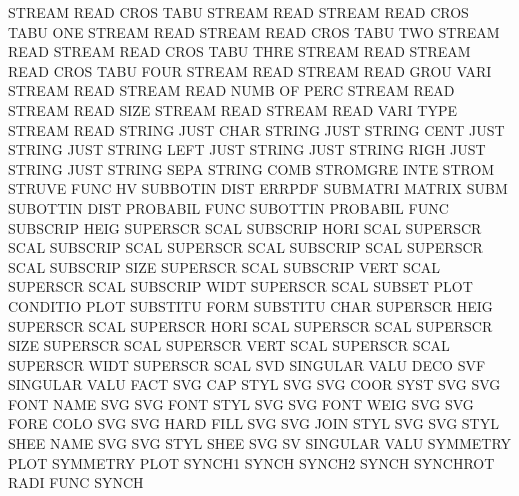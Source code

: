 STREAM   READ CROS TABU                 STREAM   READ
STREAM   READ CROS TABU ONE             STREAM   READ
STREAM   READ CROS TABU TWO             STREAM   READ
STREAM   READ CROS TABU THRE            STREAM   READ
STREAM   READ CROS TABU FOUR            STREAM   READ
STREAM   READ GROU VARI                 STREAM   READ
STREAM   READ NUMB OF   PERC            STREAM   READ
STREAM   READ SIZE                      STREAM   READ
STREAM   READ VARI TYPE                 STREAM   READ
STRING   JUST CHAR                      STRING   JUST
STRING   CENT JUST                      STRING   JUST
STRING   LEFT JUST                      STRING   JUST
STRING   RIGH JUST                      STRING   JUST
STRING   SEPA                           STRING   COMB
STROMGRE INTE                           STROM
STRUVE   FUNC                           HV
SUBBOTIN DIST                           ERRPDF
SUBMATRI                                MATRIX   SUBM
SUBOTTIN DIST                           PROBABIL FUNC
SUBOTTIN                                PROBABIL FUNC
SUBSCRIP HEIG                           SUPERSCR SCAL
SUBSCRIP HORI SCAL                      SUPERSCR SCAL
SUBSCRIP SCAL                           SUPERSCR SCAL
SUBSCRIP SCAL                           SUPERSCR SCAL
SUBSCRIP SIZE                           SUPERSCR SCAL
SUBSCRIP VERT SCAL                      SUPERSCR SCAL
SUBSCRIP WIDT                           SUPERSCR SCAL
SUBSET   PLOT                           CONDITIO PLOT
SUBSTITU FORM                           SUBSTITU CHAR
SUPERSCR HEIG                           SUPERSCR SCAL
SUPERSCR HORI SCAL                      SUPERSCR SCAL
SUPERSCR SIZE                           SUPERSCR SCAL
SUPERSCR VERT SCAL                      SUPERSCR SCAL
SUPERSCR WIDT                           SUPERSCR SCAL
SVD                                     SINGULAR VALU DECO
SVF                                     SINGULAR VALU FACT
SVG      CAP  STYL                      SVG
SVG      COOR SYST                      SVG
SVG      FONT NAME                      SVG
SVG      FONT STYL                      SVG
SVG      FONT WEIG                      SVG
SVG      FORE COLO                      SVG
SVG      HARD FILL                      SVG
SVG      JOIN STYL                      SVG
SVG      STYL SHEE NAME                 SVG
SVG      STYL SHEE                      SVG
SV                                      SINGULAR VALU
SYMMETRY PLOT                           SYMMETRY PLOT
SYNCH1                                  SYNCH
SYNCH2                                  SYNCH
SYNCHROT RADI FUNC                      SYNCH
